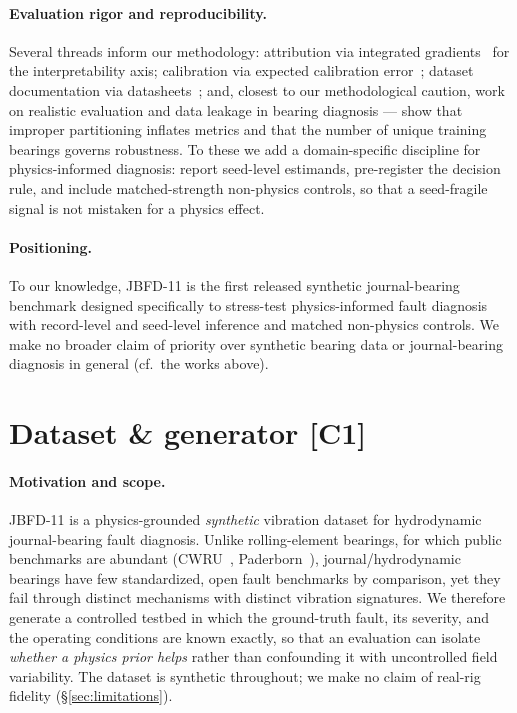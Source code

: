 \documentclass{article}
\begin{document}
\paragraph{Evaluation rigor and reproducibility.}
Several threads inform our methodology: attribution via integrated
gradients~\citep{sundararajan2017ig} for the interpretability axis; calibration
via expected calibration error~\citep{guo2017calibration}; dataset documentation
via datasheets~\citep{gebru2021datasheets}; and, closest to our methodological
caution, work on realistic evaluation and data leakage in bearing diagnosis ---
\citet{vieira2025realistic} show that improper partitioning inflates metrics and
that the number of unique training bearings governs robustness. To these we add a
domain-specific discipline for physics-informed diagnosis: report seed-level
estimands, pre-register the decision rule, and include matched-strength
non-physics controls, so that a seed-fragile signal is not mistaken for a physics
effect.

\paragraph{Positioning.}
To our knowledge, JBFD-11 is the first released synthetic journal-bearing
benchmark designed specifically to stress-test physics-informed fault diagnosis
with record-level and seed-level inference and matched non-physics controls. We
make no broader claim of priority over synthetic bearing data or journal-bearing
diagnosis in general (cf.\ the works above).

\section{Dataset \& generator [C1]}
\label{sec:dataset}

\paragraph{Motivation and scope.}
JBFD-11 is a physics-grounded \emph{synthetic} vibration dataset for
hydrodynamic journal-bearing fault diagnosis. Unlike rolling-element bearings,
for which public benchmarks are abundant (CWRU~\citep{smith2015cwru},
Paderborn~\citep{lessmeier2016paderborn}), journal/hydrodynamic bearings have few
standardized, open fault benchmarks by comparison, yet they fail through distinct
mechanisms with distinct vibration signatures. We therefore generate a
controlled testbed in which the ground-truth fault, its severity, and the
operating conditions are known exactly, so that an evaluation can isolate
\emph{whether a physics prior helps} rather than confounding it with
uncontrolled field variability. The dataset is synthetic throughout; we make no
claim of real-rig fidelity (\S\ref{sec:limitations}).
\end{document}
